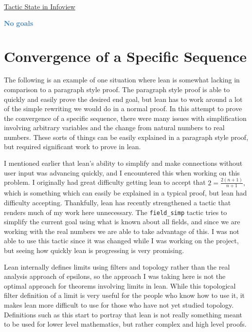 \documentclass[
  letterpaper,
]{scrreprt}
\newenvironment{Shaded}{\begin{snugshade}}{\end{snugshade}}
\newcommand{\InformationTok}[1]{\textcolor[rgb]{0.37,0.37,0.37}{#1}}
\newcommand{\SpecialStringTok}[1]{\textcolor[rgb]{0.13,0.47,0.30}{#1}}
\renewcommand{\InformationTok}[1]{\textcolor[HTML]{D2691E}{\textbf{#1}}}
\renewcommand{\SpecialStringTok}[1]{\textcolor[HTML]{4682B4}{\textbf{#1}}}
\newcommand{\nobreakShaded}{\renewenvironment{Shaded}
	{\begin{tcolorbox}[frame hidden, enhanced, interior hidden, boxrule=0pt,
		borderline west={3pt}{0pt}{shadecolor}, sharp corners]}
	{\end{tcolorbox}}}
\newenvironment{outpt}
	{\nobreakShaded\begin{minipage}[t]{0.32\textwidth}
		\uline{Tactic State in Infoview}}
	{\end{minipage}}
\theoremstyle{remark}
\begin{document}
\begin{outpt}

\begin{Shaded}
\begin{Highlighting}[]
\SpecialStringTok{No}\InformationTok{ }\SpecialStringTok{goals}
\end{Highlighting}
\end{Shaded}

\end{outpt}

\hypertarget{convergence-of-a-specific-sequence}{%
\section{Convergence of a Specific
Sequence}\label{convergence-of-a-specific-sequence}}

The following is an example of one situation where lean is somewhat
lacking in comparison to a paragraph style proof. The paragraph style
proof is able to quickly and easily prove the desired end goal, but lean
has to work around a lot of the simple rewriting we would do in a normal
proof. In this attempt to prove the convergence of a specific sequence,
there were many issues with simplification involving arbitrary variables
and the change from natural numbers to real numbers. These sorts of
things can be easily explained in a paragraph style proof, but required
significant work to prove in lean.

I mentioned earlier that lean's ability to simplify and make connections
without user input was advancing quickly, and I encountered this when
working on this problem. I originally had great difficulty getting lean
to accept that \(2 = \frac{2(n + 1)}{n + 1},\) which is something which
can easily be explained in a typical proof, but lean had difficulty
accepting. Thankfully, lean has recently strengthened a tactic that
renders much of my work here unnecessary. The \texttt{field\_simp}
tactic tries to simplify the current goal using what is known about all
fields, and since we are working with the real numbers we are able to
take advantage of this. I was not able to use this tactic since it was
changed while I was working on the project, but seeing how quickly lean
is progressing is very promising.

Lean internally defines limits using filters and topology rather than
the real analysis approach of epsilons, so the approach I was taking
here is not the optimal approach for theorems involving limits in lean.
While this topological filter definition of a limit is very useful for
the people who know how to use it, it makes lean more difficult to use
for those who have not yet studied topology. Definitions such as this
start to portray that lean is not really something meant to be used for
lower level mathematics, but rather complex and high level proofs.
\end{document}
